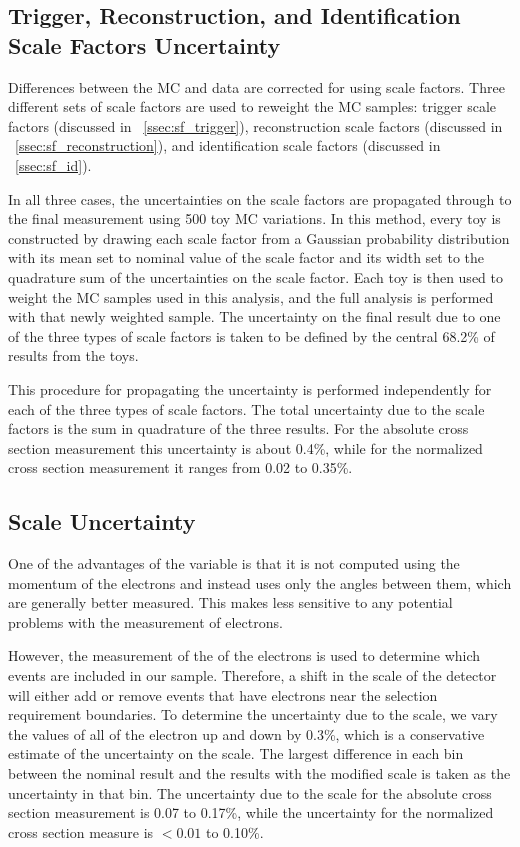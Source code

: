\subsection{Trigger, Reconstruction, and Identification Scale Factors Uncertainty}
\label{scale_factor_uncertainty}

Differences between the MC and data are corrected for using scale factors.
Three different sets of scale factors are used to reweight the MC samples:
trigger scale factors (discussed in \SEC~\ref{ssec:sf_trigger}), reconstruction
scale factors (discussed in \SEC~\ref{ssec:sf_reconstruction}), and
identification scale factors (discussed in \SEC~\ref{ssec:sf_id}).

In all three cases, the uncertainties on the scale factors are propagated
through to the final measurement using 500 toy MC variations. In this method,
every toy is constructed by drawing each scale factor from a Gaussian
probability distribution with its mean set to nominal value of the scale factor
and its width set to the quadrature sum of the uncertainties on the scale
factor. Each toy is then used to weight the MC samples used in this analysis,
and the full analysis is performed with that newly weighted sample. The
uncertainty on the final result due to one of the three types of scale factors
is taken to be defined by the central 68.2\% of results from the toys.

This procedure for propagating the uncertainty is performed independently for
each of the three types of scale factors. The total uncertainty due to the
scale factors is the sum in quadrature of the three results. For the absolute
cross section measurement this uncertainty is about 0.4\%, while for the
normalized cross section measurement it ranges from 0.02 to 0.35\%.

\subsection{\texorpdfstring{\pt}{PT} Scale Uncertainty}
\label{ssec:pt_scale_uncertainty}

One of the advantages of the \phistar variable is that it is not computed using
the momentum of the electrons and instead uses only the angles between them,
which are generally better measured. This makes \phistar less sensitive to any
potential problems with the \pt measurement of electrons.

However, the measurement of the \pt of the electrons is used to determine which
events are included in our sample. Therefore, a shift in the \pt scale of the
detector will either add or remove events that have electrons near the \pt
selection requirement boundaries. To determine the uncertainty due to the \pt
scale, we vary the \pt values of all of the electron up and down by 0.3\%,
which is a conservative estimate of the uncertainty on the \pt scale. The
largest difference in each \phistar bin between the nominal result and the
results with the modified \pt scale is taken as the uncertainty in that bin.
The uncertainty due to the \pt scale for the absolute cross section measurement
is 0.07 to 0.17\%, while the uncertainty for the normalized cross section
measure is $< 0.01$ to 0.10\%.


